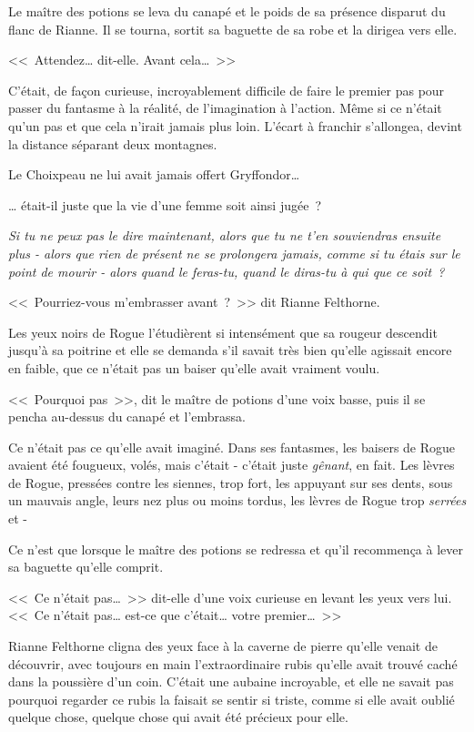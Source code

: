 Le maître des potions se leva du canapé et le poids de sa présence disparut du flanc de Rianne. Il se tourna, sortit sa baguette de sa robe et la dirigea vers elle.

<<~Attendez… dit-elle. Avant cela…~>>

C'était, de façon curieuse, incroyablement difficile de faire le premier pas pour passer du fantasme à la réalité, de l'imagination à l'action. Même si ce n'était qu'un pas et que cela n'irait jamais plus loin. L'écart à franchir s'allongea, devint la distance séparant deux montagnes.

Le Choixpeau ne lui avait jamais offert Gryffondor…

… était-il juste que la vie d'une femme soit ainsi jugée~?

\emph{Si tu ne peux pas le dire maintenant, alors que tu ne t'en souviendras ensuite plus - alors que rien de présent ne se prolongera jamais, comme si tu étais sur le point de mourir - alors quand le feras-tu, quand le diras-tu à qui que ce soit~?}

<<~Pourriez-vous m'embrasser avant~?~>> dit Rianne Felthorne.

Les yeux noirs de Rogue l'étudièrent si intensément que sa rougeur descendit jusqu'à sa poitrine et elle se demanda s'il savait très bien qu'elle agissait encore en faible, que ce n'était pas un baiser qu'elle avait vraiment voulu.

<<~Pourquoi pas~>>, dit le maître de potions d'une voix basse, puis il se pencha au-dessus du canapé et l'embrassa.

Ce n'était pas ce qu'elle avait imaginé. Dans ses fantasmes, les baisers de Rogue avaient été fougueux, volés, mais c'était - c'était juste \emph{gênant}, en fait. Les lèvres de Rogue, pressées contre les siennes, trop fort, les appuyant sur ses dents, sous un mauvais angle, leurs nez plus ou moins tordus, les lèvres de Rogue trop \emph{serrées} et -

Ce n'est que lorsque le maître des potions se redressa et qu'il recommença à lever sa baguette qu'elle comprit.

<<~Ce n'était pas…~>> dit-elle d'une voix curieuse en levant les yeux vers lui. <<~Ce n'était pas… est-ce que c'était… votre premier…~>>

Rianne Felthorne cligna des yeux face à la caverne de pierre qu'elle venait de découvrir, avec toujours en main l'extraordinaire rubis qu'elle avait trouvé caché dans la poussière d'un coin. C'était une aubaine incroyable, et elle ne savait pas pourquoi regarder ce rubis la faisait se sentir si triste, comme si elle avait oublié quelque chose, quelque chose qui avait été précieux pour elle.
